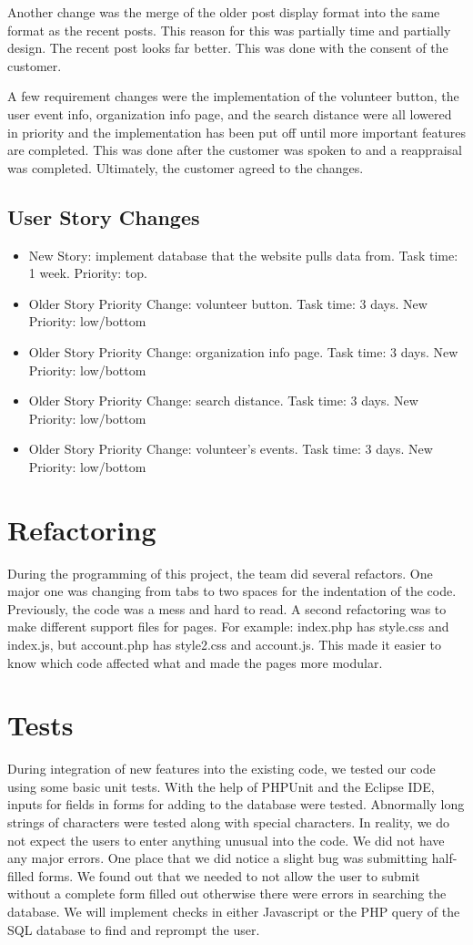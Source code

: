\documentclass[12pt]{article}
\begin{document}
	Another change was the merge of the older post display format into the same
	format as the recent posts. This reason for this was partially time and partially
	design. The recent post looks far better. This was done with the consent of the
	customer.

	A few requirement changes were the implementation of the volunteer button,
	the user event info, organization info page, and the search distance were all
	lowered in priority and the implementation has been put off until more
	important features are completed. This was done after the customer was spoken
	to and a reappraisal was completed. Ultimately, the customer agreed to the
	changes.
\subsection{User Story Changes}
\begin{itemize}
\item
	New Story: implement database that the website pulls data from. Task time: 1
	week. Priority: top.
\item
	Older Story Priority Change: volunteer button. Task time: 3 days. New Priority:
	low/bottom
\item
	Older Story Priority Change: organization info page. Task time: 3 days. New
	Priority: low/bottom
\item
	Older Story Priority Change: search distance. Task time: 3 days. New Priority:
	low/bottom
\item
	Older Story Priority Change: volunteer's events. Task time: 3 days. New Priority:
	low/bottom
\end{itemize}
\section{Refactoring}
	During the programming of this project, the team did several refactors. One
	major one was changing from tabs to two spaces for the indentation of the
	code. Previously, the code was a mess and hard to read. A second refactoring
	was to make different support files for pages. For example: index.php has
	style.css and index.js, but account.php has style2.css and account.js. This
	made it easier to know which code affected what and made the pages more modular.
\section{Tests}
	During integration of new features into the existing code, we tested our code
	using some basic unit tests. With the help of PHPUnit and the Eclipse IDE, inputs
	for fields in forms for adding to the database were tested. Abnormally long
	strings of characters were tested along with special characters. In
	reality, we do not expect the users to enter anything unusual into the code. We
	did not have any major errors. One place that we did notice a slight bug was
	submitting half-filled forms. We found out that we needed to not allow the user
	to submit without a complete form filled out otherwise there were errors in
	searching the database. We will implement checks in either Javascript or the
	PHP query of the SQL database to find and reprompt the user.
\end{document}
